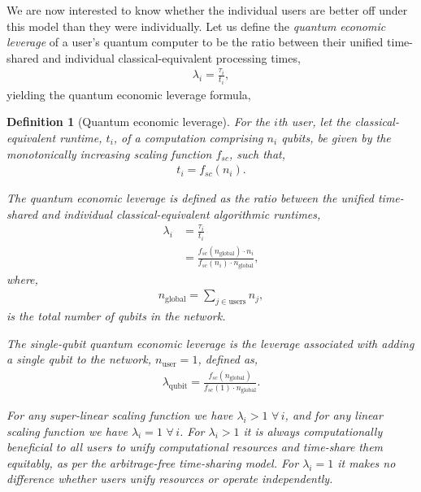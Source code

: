 \documentclass[aps, rmp, twocolumn, amsmath, amssymb, nofootinbib, superscriptaddress, longbibliography, floatfix, table-of-contents, eqsecnum]{revtex4-1}
\newtheorem{definition}{Definition}
\begin{document}
We are now interested to know whether the individual users are better off under this model than they were individually. Let us define the \textit{quantum economic leverage} of a user's quantum computer to be the ratio between their unified time-shared and individual classical-equivalent processing times,
\begin{align}
\lambda_i = \frac{\tau_i}{t_i},
\end{align}
yielding the quantum economic leverage formula,

\begin{definition}[Quantum economic leverage] \label{def:quant_econ_lev}
For the $i$th user, let the classical-equivalent runtime, $t_i$, of a computation comprising $n_i$ qubits, be given by the monotonically increasing \textit{scaling function} $f_{sc}$, such that,
\begin{align}
t_i = f_{sc}(n_i).
\end{align}

The quantum economic leverage is defined as the ratio between the unified time-shared and individual classical-equivalent algorithmic runtimes,
\begin{align}
\lambda_i &= \frac{\tau_i}{t_i} \nonumber \\
&= \frac{f_{sc}(n_\text{global})\cdot n_i}{f_{sc}(n_i) \cdot n_\text{global}},
\end{align}
where,
\begin{align}
	n_\text{global} = \sum_{j\in \text{users}} n_j,
\end{align}
is the total number of qubits in the network.

The single-qubit quantum economic leverage is the leverage associated with adding a single qubit to the network, \mbox{$n_\text{user}=1$}, defined as,
\begin{align}
	\lambda_\text{qubit} = \frac{f_{sc}(n_\text{global})}{f_{sc}(1)\cdot n_\text{global}}.
\end{align}

For any super-linear scaling function we have \mbox{$\lambda_i > 1 \,\,\forall \, i$}, and for any linear scaling function we have \mbox{$\lambda_i = 1 \,\,\forall \, i$}. For \mbox{$\lambda_i>1$} it is always computationally beneficial to all users to unify computational resources and time-share them equitably, as per the arbitrage-free time-sharing model. For \mbox{$\lambda_i=1$} it makes no difference whether users unify resources or operate independently.
\end{definition}
\end{document}
